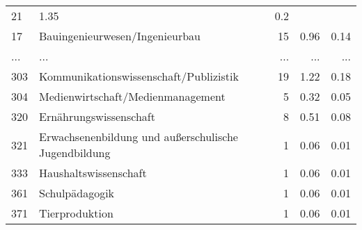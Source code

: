 \begin{longtable}{lXrrr}
          \num{21} &
          \num[round-mode=places,round-precision=2]{1.35} &
          \num[round-mode=places,round-precision=2]{0.2} \\
        17 & \multicolumn{1}{X}{Bauingenieurwesen/Ingenieurbau} & %
          \num{15} &
          \num[round-mode=places,round-precision=2]{0.96} &
          \num[round-mode=places,round-precision=2]{0.14} \\
       ... & ... & ... & ... & ... \\
        303 & \multicolumn{1}{X}{Kommunikationswissenschaft/Publizistik} & %
          \num{19} &
          \num[round-mode=places,round-precision=2]{1.22} &
          \num[round-mode=places,round-precision=2]{0.18} \\

        304 & \multicolumn{1}{X}{Medienwirtschaft/Medienmanagement} & %
          \num{5} &
          \num[round-mode=places,round-precision=2]{0.32} &
          \num[round-mode=places,round-precision=2]{0.05} \\

        320 & \multicolumn{1}{X}{Ernährungswissenschaft} & %
          \num{8} &
          \num[round-mode=places,round-precision=2]{0.51} &
          \num[round-mode=places,round-precision=2]{0.08} \\

        321 & \multicolumn{1}{X}{Erwachsenenbildung und außerschulische Jugendbildung} & %
          \num{1} &
          \num[round-mode=places,round-precision=2]{0.06} &
          \num[round-mode=places,round-precision=2]{0.01} \\

        333 & \multicolumn{1}{X}{Haushaltswissenschaft} & %
          \num{1} &
          \num[round-mode=places,round-precision=2]{0.06} &
          \num[round-mode=places,round-precision=2]{0.01} \\

        361 & \multicolumn{1}{X}{Schulpädagogik} & %
          \num{1} &
          \num[round-mode=places,round-precision=2]{0.06} &
          \num[round-mode=places,round-precision=2]{0.01} \\

        371 & \multicolumn{1}{X}{Tierproduktion} & %
          \num{1} &
          \num[round-mode=places,round-precision=2]{0.06} &
          \num[round-mode=places,round-precision=2]{0.01} \\


\end{longtable}

